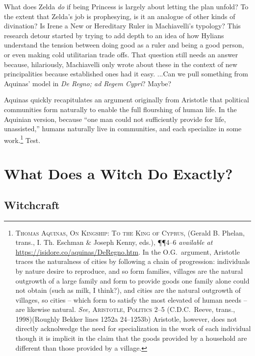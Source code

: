 \documentclass[../FGP.tex]{subfiles}
\begin{document}
What does Zelda \emph{do} if being Princess is largely about letting the plan unfold?
To the extent that Zelda's job is prophesying, is it an analogue of other kinds of divination?
Is Irene a New or Hereditary Ruler in Machiavelli's typology?
This research detour started by trying to add depth to an idea of how Hylians understand the tension between doing good as a ruler and being a good person, or even making cold utilitarian trade offs. That question still needs an answer because, hilariously, Machiavelli only wrote about these in the context of new principalities because established ones had it easy. 
 ...Can we pull something from Aquinas' model in \textit{De Regno; ad Regem Cypri}? Maybe? 

Aquinas quickly recapitulates an argument originally from Aristotle that political communities form naturally to enable the full flourshing of human life. In the Aquinian version, because ``one man could not sufficiently provide for life, unassisted,'' humans naturally live in communities, and each specialize in some work.\footnote{%
  \textsc{Thomas Aquinas, On Kingship: To the King of Cyprus}, (Gerald B. Phelan, trans., I. Th. Eschman \& Joseph Kenny, eds.), \P\P4--6 \textit{available at} \url{https://isidore.co/aquinas/DeRegno.htm}. In the O.G.~argument, Aristotle traces the naturalness of cities by following a chain of progression: individuals by nature desire to reproduce, and so form families, villages are the natural outgrowth of a large family and form to provide goods one family alone could not obtain (such as milk, I think?), and cities are the natural outgrowth of villages, so cities -- which form to satisfy the most elevated of human needs -- are likewise natural. \textit{See,} \textsc{Aristotle, Politics} 2--5 (C.D.C.~Reeve, trans., 1998)(Roughly Bekker lines 1252a 24--1253b) Aristotle, however, does not directly acknolwedge the need for specialization in the work of each individual though it is implicit in the claim that the goods provided by a household are different than those provided by a village.} %
Test.



\section{What Does a Witch Do Exactly?}

\subsection{Witchcraft}
\end{document}
